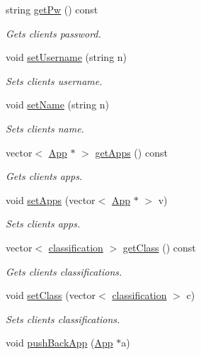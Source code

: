 \begin{DoxyCompactItemize}
string \hyperlink{class_client_a2a53bedac801f76b39eb2ed3683517a1}{get\-Pw} () const 
\begin{DoxyCompactList}\small\item\em Gets clients password. \end{DoxyCompactList}\item 
void \hyperlink{class_client_ab6e49b98d68f7cf013aaa98076ac04d1}{set\-Username} (string n)
\begin{DoxyCompactList}\small\item\em Sets clients username. \end{DoxyCompactList}\item 
void \hyperlink{class_client_a1feaa7011acc8cb176640e1af2934723}{set\-Name} (string n)
\begin{DoxyCompactList}\small\item\em Sets clients name. \end{DoxyCompactList}\item 
vector$<$ \hyperlink{class_app}{App} $\ast$ $>$ \hyperlink{class_client_a14e9a68136cae4312e98a8330c1d8b7d}{get\-Apps} () const 
\begin{DoxyCompactList}\small\item\em Gets clients apps. \end{DoxyCompactList}\item 
void \hyperlink{class_client_ae23c1978c93d67cfd1b09c94157019eb}{set\-Apps} (vector$<$ \hyperlink{class_app}{App} $\ast$ $>$ v)
\begin{DoxyCompactList}\small\item\em Sets clients apps. \end{DoxyCompactList}\item 
vector$<$ \hyperlink{structclassification}{classification} $>$ \hyperlink{class_client_abd46879af1105932e6363941022f76ce}{get\-Class} () const 
\begin{DoxyCompactList}\small\item\em Gets clients classifications. \end{DoxyCompactList}\item 
void \hyperlink{class_client_a84d1603a7a54058c8c360e2050fc8d10}{set\-Class} (vector$<$ \hyperlink{structclassification}{classification} $>$ c)
\begin{DoxyCompactList}\small\item\em Sets clients classifications. \end{DoxyCompactList}\item 
void \hyperlink{class_client_ae9852558ee40920505015ccf50735e4f}{push\-Back\-App} (\hyperlink{class_app}{App} $\ast$a)

\end{DoxyCompactItemize}

